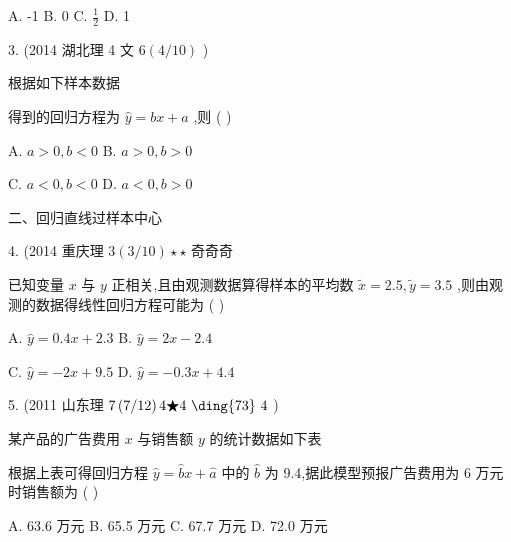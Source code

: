 \documentclass[10pt]{article}
\begin{document}
A. -1 B. 0 C. \(\frac{1}{2}\) D. 1

3. (2014 湖北理 4 文 \(6\left( {4/{10}}\right)\)           )

根据如下样本数据

\begin{center}
\end{center}

得到的回归方程为 \(\widehat{y} = {bx} + a\) ,则 ( )

A. \(a > 0,b < 0\) B. \(a > 0,b > 0\)

C. \(a < 0,b < 0\) D. \(a < 0,b > 0\)

二、回归直线过样本中心

4. (2014 重庆理 \(3\left( {3/{10}}\right)  \star   \star\) 奇奇奇

已知变量 \(x\) 与 \(y\) 正相关,且由观测数据算得样本的平均数 \(\widetilde{x} = {2.5},\widetilde{y} = {3.5}\) ,则由观测的数据得线性回归方程可能为 ( )

A. \(\widehat{y} = {0.4x} + {2.3}\) B. \(\widehat{y} = {2x} - {2.4}\)

C. \(\widehat{y} =  - {2x} + {9.5}\) D. \(\widehat{y} =  - {0.3x} + {4.4}\)

5. (2011 山东理 \(7\left( {7/{12}}\right) 4\bigstar 4\text{  \ding{73}  }4\) )

某产品的广告费用 \(x\) 与销售额 \(y\) 的统计数据如下表

\begin{center}
\end{center}

根据上表可得回归方程 \(\widehat{y} = \widehat{b}x + \widehat{a}\) 中的 \(\widehat{b}\) 为 9.4,据此模型预报广告费用为 6 万元时销售额为 ( )

A. 63.6 万元 B. 65.5 万元 C. 67.7 万元 D. 72.0 万元
\end{document}
